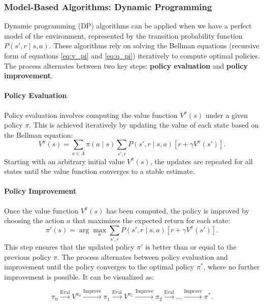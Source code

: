 \subsubsection{\textbf{Model-Based Algorithms: Dynamic Programming}}

\hspace{1em} Dynamic programming (DP) algorithms can be applied when we have a perfect model
of the environment, represented by the transition probability function \( P(s',
r \mid s, a) \). These algorithms rely on solving the Bellman equations
(recursive form of equations \ref{eq:v_pi} and \ref{eq:q_pi}) iteratively to
compute optimal policies. The process alternates between two key steps:
\textbf{policy evaluation} and \textbf{policy improvement}.

\paragraph{Policy Evaluation}
Policy evaluation involves computing the value function \( V^\pi(s) \) under a
given policy \( \pi \). This is achieved iteratively by updating the value of
each state based on the Bellman equation:
\[
    V^\pi(s) = \sum_{a \in A} \pi(a \mid s) \sum_{s', r} P(s', r \mid s, a) \left[ r + \gamma V^\pi(s') \right].
\]
Starting with an arbitrary initial value \( V^\pi(s) \), the updates are
repeated for all states until the value function converges to a stable
estimate.

\paragraph{Policy Improvement}
Once the value function \( V^\pi(s) \) has been computed, the policy is
improved by choosing the action \( a \) that maximizes the expected return for
each state:
\[
    \pi'(s) = \arg\max_a \sum_{s', r} P(s', r \mid s, a) \left[ r + \gamma V^\pi(s') \right].
\]
This step ensures that the updated policy \( \pi' \) is better than or equal to
the previous policy \( \pi \). The process alternates between policy evaluation
and improvement until the policy converges to the optimal policy \( \pi^* \),
where no further improvement is possible. It can be visualized as:

\[
    \pi_0 \xrightarrow{\text{Eval}} V^{\pi_0} \xrightarrow{\text{Improve}} \pi_1 \xrightarrow{\text{Eval}} V^{\pi_1} \xrightarrow{\text{Improve}} \pi_2 \xrightarrow{\text{Eval}} \ldots \xrightarrow{\text{Improve}} \pi^*.
\]

